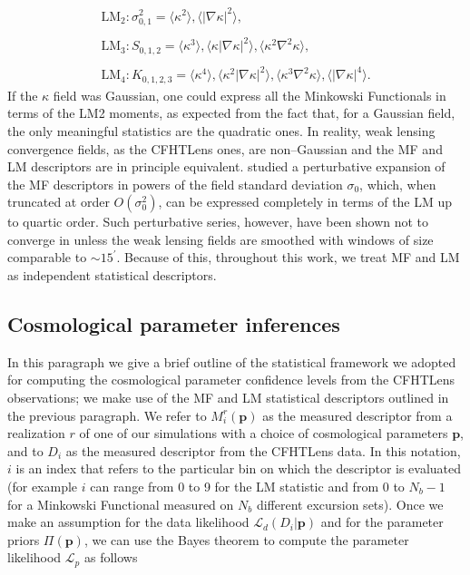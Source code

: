 \documentclass[reprint,aps,prd,superscriptaddress,showkeys]{revtex4-1}
\begin{document}
%
\begin{equation}
\begin{matrix}
\mathrm{LM_2}: \sigma_{0,1}^2 = \langle\kappa^2\rangle,\langle\vert\nabla\kappa\vert^2\rangle, \\ \\
\mathrm{LM_3}: S_{0,1,2} = \langle\kappa^3\rangle,\langle\kappa\vert\nabla\kappa\vert^2\rangle,\langle\kappa^2\nabla^2\kappa\rangle, \\ \\
\mathrm{LM_4}: K_{0,1,2,3} = \langle\kappa^4\rangle,\langle\kappa^2\vert\nabla\kappa\vert^2\rangle,\langle\kappa^3\nabla^2\kappa\rangle,\langle\vert\nabla\kappa\vert^4\rangle.
\end{matrix}
\end{equation}
%
If the $\kappa$ field was Gaussian, one could express all the Minkowski Functionals in terms of the LM2 moments, as expected from the fact that, for a Gaussian field, the only meaningful statistics are the quadratic ones. In reality, weak lensing convergence fields, as the CFHTLens ones, are non--Gaussian and the MF and LM descriptors are in principle equivalent. \citep{Munshi12,Matsubara10} studied a perturbative expansion of the MF descriptors in powers of the field standard deviation $\sigma_0$, which, when truncated at order $O(\sigma_0^2)$, can be expressed completely in terms of the LM up to quartic order. Such perturbative series, however, have been shown not to converge in \citep{Petri2013} unless the weak lensing fields are smoothed with windows of size comparable to $\sim 15^\prime$. Because of this, throughout this work, we treat MF and LM as independent statistical descriptors. 

\subsection{Cosmological parameter inferences}
\label{cosmostats}
In this paragraph we give a brief outline of the statistical framework we adopted for computing the cosmological parameter confidence levels from the CFHTLens observations; we make use of the MF and LM statistical descriptors outlined in the previous paragraph. We refer to $M_i^r(\mathbf{p})$ as the measured descriptor from a realization $r$ of one of our simulations with a choice of cosmological parameters $\mathbf{p}$, and to $D_i$ as the measured descriptor from the CFHTLens data. In this notation, $i$ is an index that refers to the particular bin on which the descriptor is evaluated (for example $i$ can range from 0 to 9 for the LM statistic and from 0 to $N_b-1$ for a Minkowski Functional measured on $N_b$ different excursion sets). Once we make an assumption for the data likelihood $\mathcal{L}_d(D_i\vert \mathbf{p})$ and for the parameter priors $\Pi(\mathbf{p})$, we can use the Bayes theorem to compute the parameter likelihood $\mathcal{L}_p$ as follows
\end{document}
